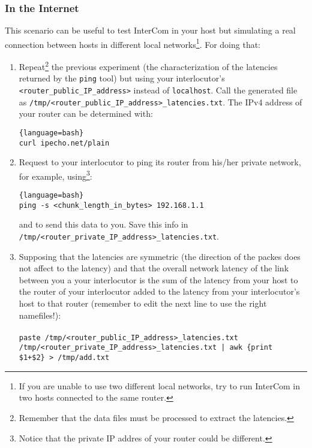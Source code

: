 \subsubsection{In the Internet}

This scenario can be useful to test InterCom in your host but
simulating a real connection between hosts in different local
networks\footnote{If you are unable to use two different local
  networks, try to run InterCom in two hosts connected to the same
  router.}. For doing that:

\begin{enumerate}
  
\item Repeat\footnote{Remember that the data files must be processed
    to extract the latencies.} the previous experiment (the
  characterization of the latencies returned by the \verb|ping| tool)
  but using your interlocutor's \verb|<router_public_IP_address>|
  instead of \verb|localhost|. Call the generated file as
  \verb|/tmp/<router_public_IP_address>_latencies.txt|. The IPv4
  address of your router can be determined with:
  
  \begin{lstlisting}{language=bash}
curl ipecho.net/plain
  \end{lstlisting}  
  
\item Request to your interlocutor to ping its router from his/her
  private network, for example, using\footnote{Notice that the private
    IP addres of your router could be different.}:
  
  \begin{lstlisting}{language=bash}
ping -s <chunk_length_in_bytes> 192.168.1.1
  \end{lstlisting}
  
  and to send this data to you. Save this info in
  \verb|/tmp/<router_private_IP_address>_latencies.txt|.

\item Supposing that the latencies are symmetric (the direction of the
  packes does not affect to the latency) and that the overall network
  latency of the link between you a your interlocutor is the sum of
  the latency from your host to the router of your interlocutor added
  to the latency from your interlocutor's host to that router
  (remember to edit the next line to use the right namefiles!):\\\\

\texttt{paste /tmp/<router\_public\_IP\_address>\_latencies.txt /tmp/<router\_private\_IP\_address>\_latencies.txt | awk
  \textquotesingle\{print \$1+\$2\}\textquotesingle~> /tmp/add.txt}\\


\end{enumerate}
